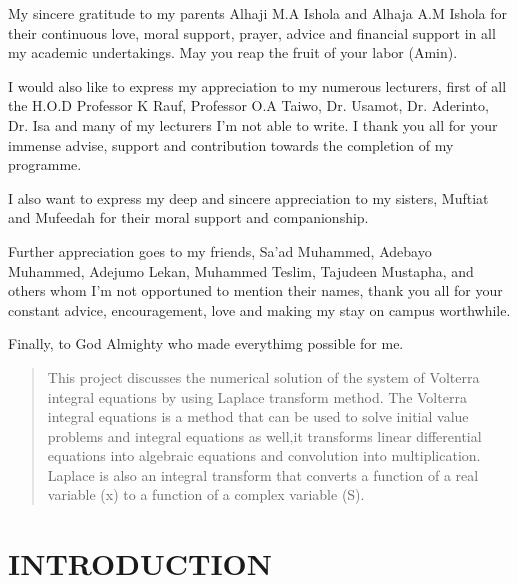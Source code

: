 \documentclass[12pt]{article}
\begin{document}
	My sincere gratitude to my parents Alhaji M.A Ishola and Alhaja A.M Ishola for their continuous love, moral support, prayer, advice and financial support in all my academic undertakings. May you reap the fruit of your labor (Amin).

	I would also like to express my appreciation to my numerous lecturers, first of all the H.O.D Professor K Rauf, Professor O.A Taiwo, Dr. Usamot, Dr. Aderinto, Dr. Isa and many of my lecturers I’m not able to write. I thank you all for your immense advise, support and contribution towards the completion of my programme.

	I also want to express my deep and sincere appreciation to my sisters, Muftiat and Mufeedah for their moral support and companionship.

	Further appreciation goes to my friends, Sa’ad Muhammed, Adebayo Muhammed, Adejumo Lekan, Muhammed Teslim, Tajudeen Mustapha, and others whom I’m not opportuned to mention their names, thank you all for your constant advice, encouragement, love and making my stay on campus worthwhile.

	Finally, to God Almighty who made everythimg possible for me.\\

\newpage
\begin{abstract}
This project discusses the numerical solution of the system of Volterra integral equations by using Laplace transform method. The Volterra integral equations is a method that can be used to solve initial value problems and integral equations as well,it transforms linear differential equations into algebraic equations and convolution into multiplication. Laplace is also an integral transform that converts a function of a real variable (x) to a function of a complex variable (S).
\end{abstract}
\newpage
\tableofcontents
\newpage
\section{INTRODUCTION}
\end{document}
